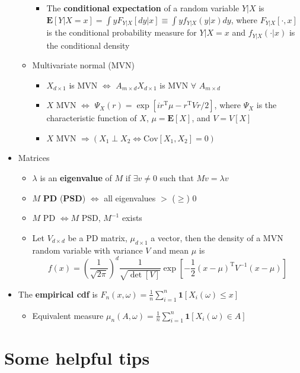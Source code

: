 \documentclass[12pt,english]{article}
\newcommand{\T}{\ensuremath{\text{T}}}
\begin{document}
\begin{itemize}
\begin{itemize}
\begin{itemize}
			\item The \textbf{conditional expectation} of a random variable $Y | X$ is $\mathbf{E}[Y | X = x] = \int y F_{Y | X}[dy | x] \equiv \int y f_{Y | X}(y | x) dy$, where $F_{Y | X}[ \cdot, x]$ is the conditional probability measure for $Y | X = x$ and $f_{Y | X}(\cdot | x)$ is the conditional density
		\end{itemize}
		\item Multivariate normal (MVN)
		\begin{itemize}
			\item $X_{d\times1}$ is MVN $\Leftrightarrow$ $A_{m\times d}X_{d\times1}$ is MVN $\forall$ $A_{m\times d}$
			\item $X$ MVN $\Leftrightarrow$ $\Psi_{X}(r) = \exp[ir^{\T}\mu - r^{\T} V r / 2]$, where $\Psi_{X}$ is the characteristic function of $X$, $\mu = \mathbf{E}[X]$, and $V = V[X]$
			\item $X$ MVN $\Rightarrow (X_{1} \perp X_{2} \Leftrightarrow \text{Cov}[X_{1}, X_{2}] = 0)$
		\end{itemize}
	\end{itemize}
	\item Matrices
	\begin{itemize}
		\item $\lambda$ is an \textbf{eigenvalue} of $M$ if $\exists v \neq 0$ such that $Mv = \lambda v$
		\item $M$ \textbf{PD} (\textbf{PSD}) $\Leftrightarrow$ all eigenvalues $>$ ($\geq$) 0
		\item $M$ PD $\Leftrightarrow M$ PSD, $M^{-1}$ exists
		\item Let $V_{d\times d}$ be a PD matrix, $\mu_{d \times 1}$ a vector, then the density of a MVN random variable with variance $V$ and mean $\mu$ is $$f(x) = \left( \frac{1}{\sqrt{2\pi}} \right)^{d} \frac{1}{\sqrt{\det[V]}} \exp \left[ -\frac{1}{2} (x - \mu)^{\T} V^{-1} (x - \mu) \right]$$
	\end{itemize}
	\item The \textbf{empirical cdf} is $F_{n}(x, \omega) = \frac{1}{n}
	\sum_{i=1}^{n} \mathbf{1}[X_{i}(\omega) \leq x]$
	\begin{itemize}
		\item Equivalent measure $\mu_{n}(A, \omega) = \frac{1}{n} \sum_{i = 1}^{n} \mathbf{1}[X_{i}(\omega) \in A]$ 
	\end{itemize}
\end{itemize}

\section{Some helpful tips}
\end{document}
